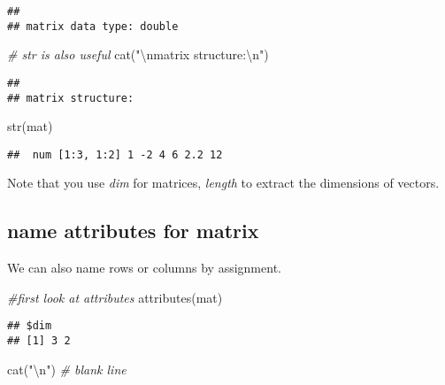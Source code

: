 \documentclass[
]{article}
\newenvironment{Shaded}{\begin{snugshade}}{\end{snugshade}}
\newcommand{\CommentTok}[1]{\textcolor[rgb]{0.56,0.35,0.01}{\textit{#1}}}
\newcommand{\FunctionTok}[1]{\textcolor[rgb]{0.00,0.00,0.00}{#1}}
\newcommand{\NormalTok}[1]{#1}
\newcommand{\SpecialCharTok}[1]{\textcolor[rgb]{0.00,0.00,0.00}{#1}}
\newcommand{\StringTok}[1]{\textcolor[rgb]{0.31,0.60,0.02}{#1}}
\begin{document}
\begin{verbatim}
## 
## matrix data type: double
\end{verbatim}

\begin{Shaded}
\begin{Highlighting}[]
\CommentTok{\# str is also useful}
\FunctionTok{cat}\NormalTok{(}\StringTok{"}\SpecialCharTok{\textbackslash{}n}\StringTok{matrix structure:}\SpecialCharTok{\textbackslash{}n}\StringTok{"}\NormalTok{)}
\end{Highlighting}
\end{Shaded}

\begin{verbatim}
## 
## matrix structure:
\end{verbatim}

\begin{Shaded}
\begin{Highlighting}[]
\FunctionTok{str}\NormalTok{(mat)}
\end{Highlighting}
\end{Shaded}

\begin{verbatim}
##  num [1:3, 1:2] 1 -2 4 6 2.2 12
\end{verbatim}

Note that you use \emph{dim} for matrices, \emph{length} to extract the
dimensions of vectors.

\hypertarget{name-attributes-for-matrix}{%
\subsection{name attributes for
matrix}\label{name-attributes-for-matrix}}

We can also name rows or columns by assignment.

\begin{Shaded}
\begin{Highlighting}[]
\CommentTok{\#first look at attributes}
\FunctionTok{attributes}\NormalTok{(mat)}
\end{Highlighting}
\end{Shaded}

\begin{verbatim}
## $dim
## [1] 3 2
\end{verbatim}

\begin{Shaded}
\begin{Highlighting}[]
\FunctionTok{cat}\NormalTok{(}\StringTok{"}\SpecialCharTok{\textbackslash{}n}\StringTok{"}\NormalTok{)    }\CommentTok{\# blank line}
\end{Highlighting}
\end{Shaded}
\end{document}
